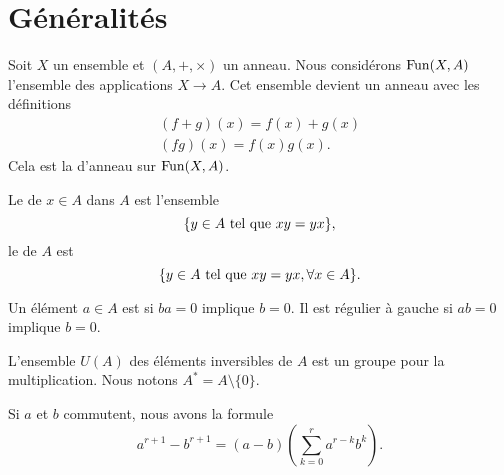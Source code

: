 
\section{Généralités}

Soit \( X\) un ensemble et $(A, +, \times)$ un anneau. Nous considérons \( \operatorname{Fun}(X,A)\) l'ensemble des applications \( X\to A\). Cet ensemble devient un anneau avec les définitions
\begin{subequations}
    \begin{align}
        (f+g)(x)=f(x)+g(x)\\
        (fg)(x)=f(x)g(x).
    \end{align}
\end{subequations}
Cela est la  d'anneau sur \( \operatorname{Fun}(X,A)\).

Le  de \( x\in A\) dans \( A\) est l'ensemble
\begin{equation}
    \{ y\in A\text{ tel que } xy=yx \},
\end{equation}
le  de \( A\) est
\begin{equation}
    \{ y\in A\text{ tel que } xy=yx,\forall x\in A \}.
\end{equation}

Un élément \( a\in A\) est  si \( ba=0\) implique \( b=0\). Il est régulier à gauche si \( ab=0\) implique \( b=0\).

L'ensemble \( U(A)\) des éléments inversibles de \( A\) est un groupe pour la multiplication. Nous notons \( A^*=A\setminus\{ 0 \}\).

\begin{lemma}
    Si \( a\) et \( b\) commutent, nous avons la formule
    \begin{equation}        \label{Eqarpurmkbk}
        a^{r+1}-b^{r+1}=(a-b)\left(\sum_{k=0}^ra^{r-k}b^k\right).
    \end{equation}
\end{lemma}

